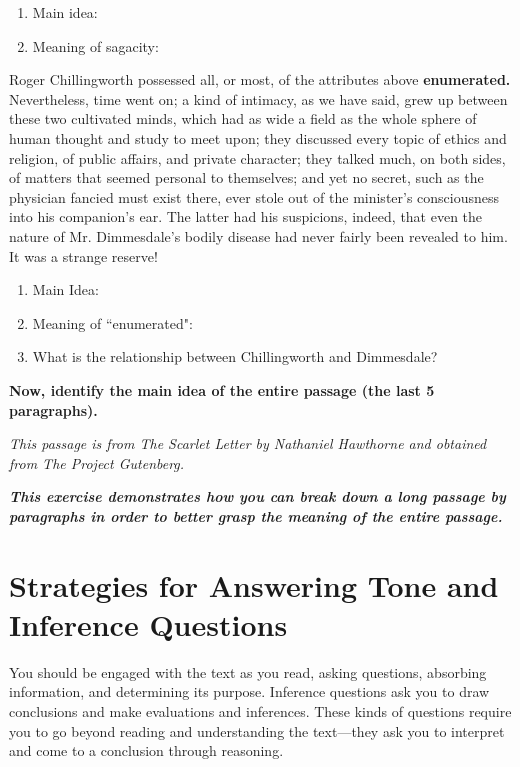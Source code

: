 \begin{enumerate} 
\item Main idea: \hrulefill
\item Meaning of sagacity: \hrulefill 
\end{enumerate}

\begin{linenumbers}
\modulolinenumbers[5]
\indent Roger Chillingworth possessed all, or most, of the attributes above \textbf{enumerated.} Nevertheless, time went on; a kind of intimacy, as we have said, grew up between these two cultivated minds, which had as wide a field as the whole sphere of human thought and study to meet upon; they discussed every topic of ethics and religion, of public affairs, and private character; they talked much, on both sides, of matters that seemed personal to themselves; and yet no secret, such as the physician fancied must exist there, ever stole out of the minister's consciousness into his companion's ear. The latter had his suspicions, indeed, that even the nature of Mr. Dimmesdale's bodily disease had never fairly been revealed to him. It was a strange reserve!
\end{linenumbers}

\begin{enumerate}
\item Main Idea: \hrulefill
\item Meaning of ``enumerated": \hrulefill 
\item What is the relationship between Chillingworth and Dimmesdale? \hrulefill
\end{enumerate}

\bigskip
\textbf{Now, identify the main idea of the entire passage (the last 5 paragraphs).}

\bigskip
\hrulefill

\bigskip
\textit{This passage is from The Scarlet Letter by Nathaniel Hawthorne and obtained from The Project Gutenberg.}

\bigskip
\textbf{\textit{This exercise demonstrates how you can break down a long passage by paragraphs in order to better grasp the meaning of the entire passage. }}

\newpage
\section[Tone and Inference]{Strategies for Answering Tone and Inference Questions}
You should be engaged with the text as you read, asking questions, absorbing information, and determining its purpose.
Inference questions ask you to draw conclusions and make evaluations and inferences.  These kinds of questions require you to go beyond reading and understanding the text—they ask you to interpret and come to a conclusion through reasoning.

